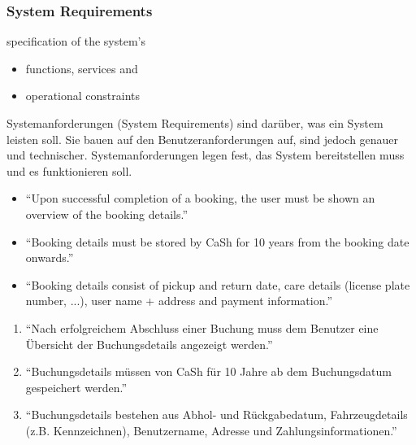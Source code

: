 \subsubsection{System Requirements}
\begin{defBox}[title=System Requirements (Systemanforderungen)]
	 specification of the system's
	\begin{itemize}
		\item functions, services and
		\item operational constraints
	\end{itemize}
\end{defBox}
\begin{infoBox}
    Systemanforderungen (System Requirements) sind  darüber, was ein System leisten soll. Sie bauen auf den Benutzeranforderungen auf, sind jedoch genauer und technischer. Systemanforderungen legen fest,  das System bereitstellen muss und  es funktionieren soll.
\end{infoBox}
\begin{defBox}[title=Example (CaSh System Requirements)]
    \begin{itemize}
        \item \enquote{Upon successful completion of a booking, the user must be shown an overview of the booking details.}
        \item \enquote{Booking details must be stored by CaSh for 10 years from the booking date onwards.}
        \item \enquote{Booking details consist of pickup and return date, care details (license plate number, ...), user name + address and payment information.}
    \end{itemize}
\end{defBox}
\begin{infoBox}
    \begin{enumerate}
        \item \enquote{Nach erfolgreichem Abschluss einer Buchung muss dem Benutzer eine Übersicht der Buchungsdetails angezeigt werden.}
        \item \enquote{Buchungsdetails müssen von CaSh für 10 Jahre ab dem Buchungsdatum gespeichert werden.}
        \item \enquote{Buchungsdetails bestehen aus Abhol- und Rückgabedatum, Fahrzeugdetails (z.B. Kennzeichnen), Benutzername, Adresse und Zahlungsinformationen.}
    \end{enumerate}
\end{infoBox}

